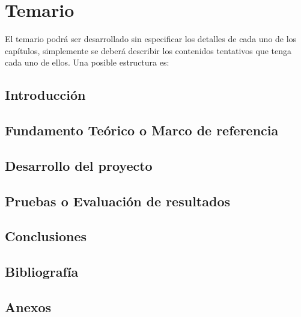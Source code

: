 \section{Temario}\label{sc:Tem}

El temario podrá ser desarrollado sin especificar los detalles de cada uno de los capítulos, simplemente se deberá describir los contenidos tentativos que tenga cada uno de ellos. Una posible estructura es:

\subsection*{Introducción}
\subsection*{Fundamento Teórico o Marco de referencia}
\subsection*{Desarrollo del proyecto}
\subsection*{Pruebas o Evaluación de resultados}
\subsection*{Conclusiones}
\subsection*{Bibliografía}
\subsection*{Anexos}